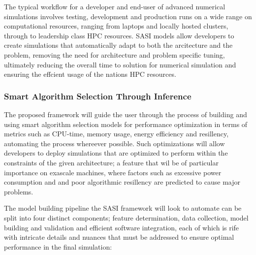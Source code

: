 The typical workflow for a developer and end-user of advanced numerical simulations involves testing, development and production runs on a wide range on computational resources, ranging from laptops and locally hosted clusters, through to leadership class HPC resources. SASI models allow developers to create simulations that automatically adapt to both the arcitecture and the problem, removing the need for architecture and problem specific tuning, ultimately reducing the overall time to solution for numerical simulation and ensuring the effcient usage of the nations HPC resources.  


\subsubsection{Smart Algorithm Selection Through Inference }

The proposed framework will guide the user through the process of building and using smart algorithm selection models for performance optimization in terms of metrics such as CPU-time, memory usage, energy efficiency and resillency, automating the process whereever possible. Such optimizations will allow developers to deploy simulations that are optimized to perform within the constraints of the given architecture; a feature that wil be of particular importance on exascale machines, where factors such as excessive power consumption and and poor algorithmic resillency are predicted to cause major problems.

The model building pipeline the SASI framework will look to automate can be split into four distinct components; feature determination, data collection, model building and validation and efficient software integration, each of which is rife with intricate details and nuances that must be addressed to ensure optimal performance in the final simulation:

